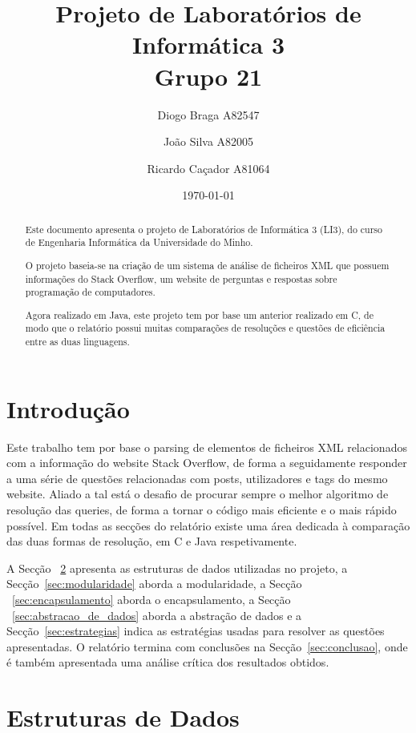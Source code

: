 \documentclass[a4paper]{article}
\title{Projeto de Laboratórios de Informática 3\\Grupo 21}
\author{Diogo Braga A82547 \and João Silva A82005 \and Ricardo Caçador A81064}
\date{\today}
\begin{document}
\maketitle

\begin{abstract}
Este documento apresenta o projeto de Laboratórios de Informática
3 (LI3), do curso de Engenharia Informática da Universidade
do Minho.

O projeto baseia-se na criação de um sistema de análise de ficheiros 
XML que possuem informações do Stack Overflow, um website de perguntas
e respostas sobre programação de computadores.

Agora realizado em Java, este projeto tem por base um anterior realizado em
C, de modo que o relatório possui muitas comparações de resoluções e
questões de eficiência entre as duas linguagens.

\end{abstract}

\tableofcontents

\section{Introdução}
\label{sec:intro}

Este trabalho tem por base o parsing de elementos de ficheiros XML
relacionados com a informação do website Stack Overflow, de forma
a seguidamente responder a uma série de questões relacionadas com
posts, utilizadores e tags do mesmo website. Aliado a tal está o desafio
de procurar sempre o melhor algoritmo de resolução das queries, de 
forma a tornar o código mais eficiente e o mais rápido possível.
Em todas as secções do relatório existe uma área dedicada à comparação
das duas formas de resolução, em C e Java respetivamente.

A Secção ~\ref{sec:estruturas} apresenta as estruturas de dados utilizadas 
no projeto, a Secção~\ref{sec:modularidade} aborda a modularidade, 
a Secção ~\ref{sec:encapsulamento} aborda o encapsulamento, a 
Secção ~\ref{sec:abstracao_de_dados} aborda a abstração de dados e a 
Secção~\ref{sec:estrategias} indica as estratégias usadas para resolver 
as questões apresentadas. O relatório termina com conclusões na
Secção~\ref{sec:conclusao}, onde é também apresentada uma análise
crítica dos resultados obtidos.

\section{Estruturas de Dados}
\label{sec:estruturas}
\end{document}
